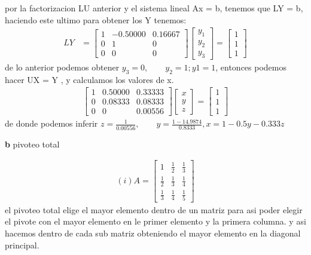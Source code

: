 \begin{enumerate}
	por la factorizacion LU anterior y el sistema lineal Ax = b, tenemos que LY = b, haciendo este ultimo para obtener los Y tenemos:
	\begin{align*}
		LY &= 
		\begin{bmatrix}
			1  &-0.50000   &0.16667\\
		    0   &1   &0\\
		    0   &0   &0
		\end{bmatrix}
		\begin{bmatrix}
			y_1\\
			y_2\\
			y_3
		\end{bmatrix}
		=
		\begin{bmatrix}
			1\\
			1\\
			1
		\end{bmatrix}
	\end{align*}
	de lo anterior podemos obtener $y_3 = 0, \qquad y_2 = 1; y1 = 1$, entonces podemos hacer UX = Y , y calculamos los valores de x.
	\begin{align*}
		\begin{bmatrix}
		1   &0.50000  & 0.33333\\
  		0   &0.08333   &0.08333\\
	    0   &0		   &0.00556
		\end{bmatrix}
		\begin{bmatrix}
		x\\
		y\\
		z
		\end{bmatrix} 
		=
		\begin{bmatrix}
			1\\
			1\\
			1
		\end{bmatrix}
	\end{align*}
	de donde podemos inferir $z = \frac{1}{0.00556}, \qquad y = \frac{1-14.9874}{0.8333}, x = 1-0.5y-0.333z$
	
\textbf{b} pivoteo total

\begin{align*}
	(i) A =
\begin{bmatrix}
1 &\frac{1}{2} &\frac{1}{3} \\[6pt]
\frac{1}{2} &\frac{1}{3} &\frac{1}{4} \\[6pt]
\frac{1}{3} &\frac{1}{4} &\frac{1}{5} 
\end{bmatrix}
\end{align*}
el pivoteo total elige el mayor elemento dentro de un matriz para asi poder elegir el pivote con el mayor elemento en le primer elemento y la primera columna. y asi hacemos dentro de cada sub matriz obteniendo el mayor elemento en la diagonal principal.


\end{enumerate}
